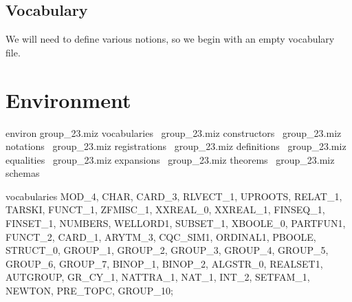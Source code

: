 \subsection*{Vocabulary}
We will need to define various notions, so we begin with an empty
vocabulary file.

\nwenddocs{}\endmoddef\nwstartdeflinemarkup\nwenddeflinemarkup
{}\nwendcode{}\nwdocspar
\nwenddocs{}%

\section{Environment}


\nwenddocs{}\endmoddef\nwstartdeflinemarkup{}\nwenddeflinemarkup
environ
\LA{}\code{}group{\_}23.miz\edoc{} vocabularies~{\nwtagstyle{}}\RA{}
\LA{}\code{}group{\_}23.miz\edoc{} constructors~{\nwtagstyle{}}\RA{}
\LA{}\code{}group{\_}23.miz\edoc{} notations~{\nwtagstyle{}}\RA{}
\LA{}\code{}group{\_}23.miz\edoc{} registrations~{\nwtagstyle{}}\RA{}
\LA{}\code{}group{\_}23.miz\edoc{} definitions~{\nwtagstyle{}}\RA{}
\LA{}\code{}group{\_}23.miz\edoc{} equalities~{\nwtagstyle{}}\RA{}
\LA{}\code{}group{\_}23.miz\edoc{} expansions~{\nwtagstyle{}}\RA{}
\LA{}\code{}group{\_}23.miz\edoc{} theorems~{\nwtagstyle{}}\RA{}
\LA{}\code{}group{\_}23.miz\edoc{} schemas~{\nwtagstyle{}}\RA{}
\nwendcode{}\nwdocspar

\nwenddocs{}\endmoddef\nwstartdeflinemarkup{}\nwenddeflinemarkup
 vocabularies MOD_4, CHAR, CARD_3, RLVECT_1, UPROOTS,
   RELAT_1, TARSKI, FUNCT_1, ZFMISC_1, XXREAL_0, XXREAL_1, FINSEQ_1,
   FINSET_1, NUMBERS, WELLORD1, SUBSET_1, XBOOLE_0, PARTFUN1,
   FUNCT_2, CARD_1, ARYTM_3, CQC_SIM1, ORDINAL1, PBOOLE,
   STRUCT_0, GROUP_1, GROUP_2, GROUP_3, GROUP_4, GROUP_5,
   GROUP_6, GROUP_7, BINOP_1, BINOP_2, ALGSTR_0, REALSET1, AUTGROUP, GR_CY_1, NATTRA_1,
   NAT_1, INT_2, SETFAM_1, NEWTON, PRE_TOPC, GROUP_10;
\nwendcode{}\nwdocspar

